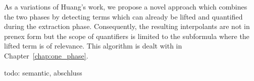 As a variations of Huang's work, we propose a novel approach which combines the two phases by detecting terms which can already be lifted and quantified during the extraction phase.
Consequently, the resulting interpolants are not in prenex form but the scope of quantifiers is limited to the subformula where the lifted term is of relevance.
This algorithm is dealt with in Chapter~\ref{chap:one_phase}.

todo: semantic, abschluss





